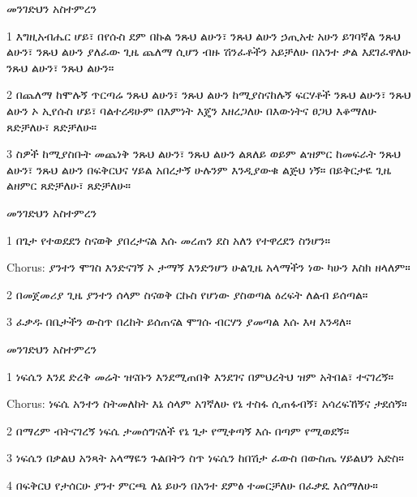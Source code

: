 \documentclass[12pt]{article}
\begin{document}
\begin{hymn}{4}{መንገድህን አስተምረን}
\begin{stanza}
1 እግዚአብሔር ሆይ፣ በየሱስ ደም በኩል 
ንጹህ ልሁን፣ ንጹህ ልሁን
ኃጢአቴ አሁን ይገባኛል
ንጹህ ልሁን፣ ንጹህ ልሁን
ያለፈው ጊዜ ጨለማ ሲሆን
ብዙ ሽንፈቶችን አይቻለሁ
በአንተ ቃል እደገፈዋለሁ
ንጹህ ልሁን፣ ንጹህ ልሁን።
\end{stanza}
\begin{stanza}
2 በጨለማ ከሞሉኝ ጥርጣሬ
ንጹህ ልሁን፣ ንጹህ ልሁን
ከሚያስናከሉኝ ፍርሃቶች
ንጹህ ልሁን፣ ንጹህ ልሁን
ኦ ኢየሱስ ሆይ፣ ባልተረዳሁም
በእምነት እጄን እዘረጋለሁ
በእውነትና ፀጋህ እቆማለሁ
ጸድቻለሁ፣ ጸድቻለሁ።
\end{stanza}
\begin{stanza}
3 ስዎች ከሚያስቡት መጨነቅ
ንጹህ ልሁን፣ ንጹህ ልሁን
ልጸለይ ወይም ልዝምር ከመፍራት
ንጹህ ልሁን፣ ንጹህ ልሁን
በፍቅርህና ሃይል አበረታኝ
ሁሉንም እንዲያውቁ ልጅህ ነኝ።
በይቅርታዬ ጊዜ ልዘምር
ጸድቻለሁ፣ ጸድቻለሁ።
\end{stanza}
\end{hymn}

\begin{hymn}{4}{መንገድህን አስተምረን}
\begin{stanza}
1 በጌታ የተወደደን
ስናወቅ ያበረታናል
እሱ መረጠን ደስ አለን
የተዋረደን ስንሆን።
\end{stanza}
\begin{chorus}
Chorus: ያንተን ሞገስ እንድናገኝ
ኦ ታማኝ እንድንሆን
ሁልጊዜ አላማችን ነው
ካሁን እስክ ዘላለም።
\end{chorus}
\begin{stanza}
2 በመጀመሪያ ጊዜ
ያንተን ሰላም ስናወቅ
ርኩስ የሆነው ያስወጣል
ዕረፍት ለልብ ይሰጣል።
\end{stanza}
\begin{stanza}
3 ፈቃዱ በቤታችን ውስጥ
በረከት ይሰጠናል
ሞገሱ ብርሃን ያመጣል
እሱ እዛ እንዳለ።
\end{stanza}
\end{hymn}

\begin{hymn}{4}{መንገድህን አስተምረን}
\begin{stanza}
1 ነፍሴን እንደ ድረቅ መሬት 
ዝናቡን እንደሚጠበቅ
እንደገና በምህረትህ
ዝም አትበል፣ ተናገረኝ።
\end{stanza}
\begin{chorus}
Chorus: ነፍሴ አንተን ስትመለከት
እኔ ሰላም አገኛለሁ
የኔ ተስፋ ሲጠፋብኝ፣
አሳረፍኸኝና ታደሰኝ።
\end{chorus}
\begin{stanza}
2 በማረም ብትናገረኝ
ነፍሴ ታመሰግናለች
የኔ ጌታ የሚቀጣኝ
እሱ በጣም የሚወደኝ።
\end{stanza}
\begin{stanza}
3 ነፍሴን በቃልህ አንጻት
አላማዬን ጉልበትን ስጥ
ነፍሴን ከበሽታ ፈውስ
በውስጤ ሃይልህን አድስ።
\end{stanza}
\begin{stanza}
4 በፍቅርህ የታሰርሁ
ያንተ ምርጫ ለኔ ይሁን 
በአንተ ደምፅ ተመርቻለሁ
በፈቃዴ እሰማለሁ።
\end{stanza}
\end{hymn}

\newpage
\tableofcontents
\end{document}
